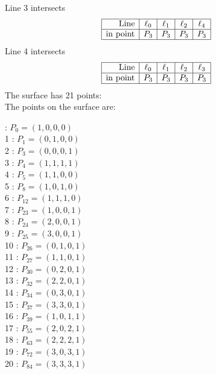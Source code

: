 \documentclass{article}
\begin{document}
{$$$$
Line 3 intersects 
$$
\begin{array}{|r*{4}{|c}|}
\hline
\mbox{Line}  & \ell_{0} & \ell_{1} & \ell_{2} & \ell_{4}\\
\hline
\mbox{in point}  & P_{3} & P_{3} & P_{3} & P_{3}\\
\hline
\end{array}
$$
Line 4 intersects 
$$
\begin{array}{|r*{4}{|c}|}
\hline
\mbox{Line}  & \ell_{0} & \ell_{1} & \ell_{2} & \ell_{3}\\
\hline
\mbox{in point}  & P_{3} & P_{3} & P_{3} & P_{3}\\
\hline
\end{array}
$$
The surface has 21 points:\\
The points on the surface are:\\
\begin{multicols}{3}
 : $P_{0}=( 1, 0, 0, 0 )$\\
1 : $P_{1}=( 0, 1, 0, 0 )$\\
2 : $P_{3}=( 0, 0, 0, 1 )$\\
3 : $P_{4}=( 1, 1, 1, 1 )$\\
4 : $P_{5}=( 1, 1, 0, 0 )$\\
5 : $P_{8}=( 1, 0, 1, 0 )$\\
6 : $P_{12}=( 1, 1, 1, 0 )$\\
7 : $P_{23}=( 1, 0, 0, 1 )$\\
8 : $P_{24}=( 2, 0, 0, 1 )$\\
9 : $P_{25}=( 3, 0, 0, 1 )$\\
10 : $P_{26}=( 0, 1, 0, 1 )$\\
11 : $P_{27}=( 1, 1, 0, 1 )$\\
12 : $P_{30}=( 0, 2, 0, 1 )$\\
13 : $P_{32}=( 2, 2, 0, 1 )$\\
14 : $P_{34}=( 0, 3, 0, 1 )$\\
15 : $P_{37}=( 3, 3, 0, 1 )$\\
16 : $P_{39}=( 1, 0, 1, 1 )$\\
17 : $P_{55}=( 2, 0, 2, 1 )$\\
18 : $P_{63}=( 2, 2, 2, 1 )$\\
19 : $P_{72}=( 3, 0, 3, 1 )$\\
20 : $P_{84}=( 3, 3, 3, 1 )$\\
\end{multicols}


%


%


}%
\end{document}
